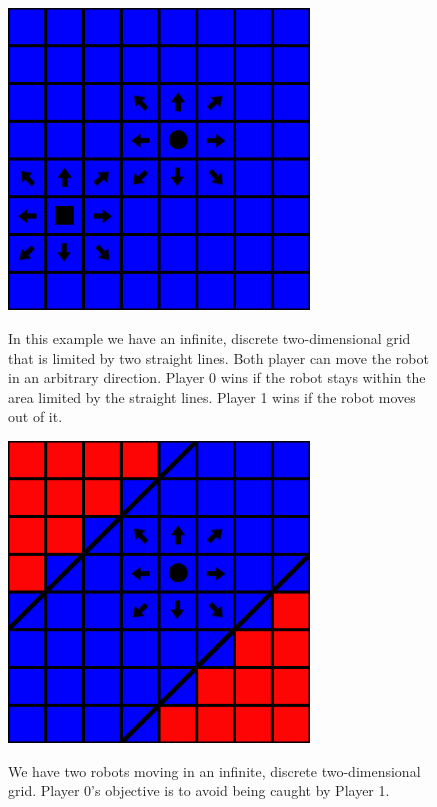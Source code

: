 \documentclass[10pt,a4paper]{article}
\theoremstyle{plain}
\theoremstyle{definition}
\begin{document}
\begin{figure}
  \caption{In this example we have an infinite, discrete two-dimensional grid that is limited by two straight lines. Both player can move the robot in an arbitrary direction. Player 0 wins if the robot stays within the area limited by the straight lines. Player 1 wins if the robot moves out of it.}
  \centering
    {\includegraphics[width=8.0cm]{catch.png}} 
\end{figure}

\begin{figure}
  \caption{We have two robots moving in an infinite, discrete two-dimensional grid. Player 0's objective is to avoid being caught by Player 1.
}
  \centering
    {\includegraphics[width=8.0cm]{zwei_geraden.png}} 
\end{figure}
\newpage


\end{document}
